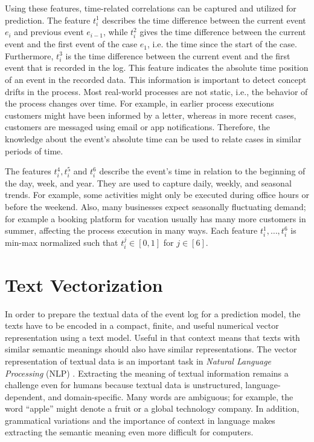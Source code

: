 Using these features, time-related correlations can be captured and utilized for prediction.
The feature $t_i^1$ describes the time difference between the current event $e_i$ and previous event $e_{i-1}$, while $t_i^2$ gives the time difference between the current event and the first event of the case $e_1$, i.e. the time since the start of the case.
Furthermore, $t_i^3$ is the time difference between the current event and the first event that is recorded in the log.
This feature indicates the absolute time position of an event in the recorded data.
This information is important to detect concept drifts \cite{DBLP:journals/tnn/BoseAZP14} in the process.
Most real-world processes are not static, i.e., the behavior of the process changes over time.
For example, in earlier process executions customers might have been informed by a letter, whereas in more recent cases, customers are messaged using email or app notifications.
Therefore, the knowledge about the event’s absolute time can be used to relate cases in similar periods of time.

The features $t_i^4, t_i^5$ and $t_i^6$ describe the event’s time in relation to the beginning of the day, week, and year.
They are used to capture daily, weekly, and seasonal trends.
For example, some activities might only be executed during office hours or before the weekend.
Also, many businesses expect seasonally fluctuating demand; for example a booking platform for vacation usually has many more customers in summer, affecting the process execution in many ways.
Each feature $t_i^1, \dots, t_i^6$ is min-max normalized such that $t_i^j \in [0,1]$ for $j \in [6]$.

\section{Text Vectorization}\label{sec:text}

In order to prepare the textual data of the event log for a prediction model, the texts have to be encoded in a compact, finite, and useful numerical vector representation using a text model.
Useful in that context means that texts with similar semantic meanings should also have similar representations.
The vector representation of textual data is an important task in \textit{Natural Language Processing} (NLP) \cite{DBLP:books/daglib/0001548}.
Extracting the meaning of textual information remains a challenge even for humans because textual data is unstructured, language-dependent, and domain-specific.
Many words are ambiguous; for example, the word \enquote{apple} might denote a fruit or a global technology company.
In addition, grammatical variations and the importance of context in language makes extracting the semantic meaning even more difficult for computers.

